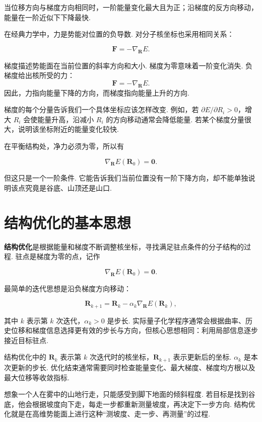 \documentclass[UTF8,11pt,a4paper,openany]{ctexbook}
\newcommand{\term}[1]{\textbf{#1}}
\begin{document}
当位移方向与梯度方向相同时，一阶能量变化最大且为正；沿梯度的反方向移动，能量在一阶近似下下降最快. 

在经典力学中，力是势能对位置的负导数. 对分子核坐标也采用相同关系：

\[
\mathbf F=-\nabla_{\mathbf R}E.
\]

\begin{definitionbox}
梯度描述势能面在当前位置的斜率方向和大小. 梯度为零意味着一阶变化消失. 负梯度给出核所受的力：
\[
\mathbf F=-\nabla_{\mathbf R}E.
\]
因此，力指向能量下降的方向，而梯度指向能量上升的方向. 
\end{definitionbox}

梯度的每个分量告诉我们一个具体坐标应该怎样改变. 例如，若 $\partial E/\partial R_i>0$，增大 $R_i$ 会使能量升高，沿减小 $R_i$ 的方向移动通常会降低能量. 若某个梯度分量很大，说明该坐标附近的能量变化较快. 

在平衡结构处，净力必须为零，所以有

\[
\nabla_{\mathbf R}E(\mathbf R_0)=\mathbf 0.
\]

但这只是一个一阶条件. 它能告诉我们当前位置没有一阶下降方向，却不能单独说明该点究竟是谷底、山顶还是山口. 

\section{结构优化的基本思想}

\term{结构优化}是根据能量和梯度不断调整核坐标，寻找满足驻点条件的分子结构的过程. 驻点是梯度为零的点，记作

\[
\nabla_{\mathbf R}E(\mathbf R_0)=\mathbf 0.
\]

最简单的迭代思想是沿负梯度方向移动：

\[
\mathbf R_{k+1}
=
\mathbf R_k-\alpha_k\nabla_{\mathbf R}E(\mathbf R_k),
\]

其中 $k$ 表示第 $k$ 次迭代，$\alpha_k>0$ 是步长. 实际量子化学程序通常会根据曲率、历史位移和梯度信息选择更有效的步长与方向，但核心思想相同：利用局部信息逐步接近目标驻点. 

\begin{notationbox}
结构优化中的 $\mathbf R_k$ 表示第 $k$ 次迭代时的核坐标，$\mathbf R_{k+1}$ 表示更新后的坐标. $\alpha_k$ 是本次更新的步长. 优化结束通常需要同时检查能量变化、最大梯度、梯度均方根以及最大位移等收敛指标. 
\end{notationbox}

\begin{analogybox}
想象一个人在雾中的山地行走，只能感受到脚下地面的倾斜程度. 若目标是找到谷底，他会根据坡度向下走，每走一步都重新测量坡度，再决定下一步方向. 结构优化就是在高维势能面上进行这种“测坡度、走一步、再测量”的过程. 
\end{analogybox}
\end{document}
